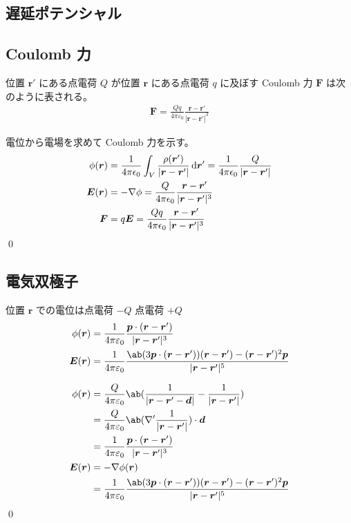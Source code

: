 \documentclass[uplatex,dvipdfmx,a4paper,11pt]{jlreq}
\makeatletter
\newcommand{\EE}{\bm{E}}
\newcommand{\rr}{\bm{r}}
\newcommand{\pp}{\bm{p}}
\newcommand{\vnabla}{\mathbf{\nabla}}
\theoremstyle{definition}
\renewenvironment{proof}[1][\proofname]{\par
  \normalfont
  \topsep6\p@\@plus6\p@ \trivlist
  \item[\hskip\labelsep{\bfseries #1}\@addpunct{\bfseries}]\ignorespaces\quad\par
}{%
  \qed\endtrivlist\@endpefalse
}
\renewcommand\proofname{証明}
\makeatother
\begin{document}
\subsection{遅延ポテンシャル}

\subsection{Coulomb 力}
\begin{theorem}
  位置 $\rr'$ にある点電荷 $Q$ が位置 $\rr$ にある点電荷 $q$ に及ぼす Coulomb 力 $\bm{F}$ は次のように表される。
  \begin{align}
    \bm{F} = \frac{Qq}{4\pi\varepsilon_0}\frac{\rr - \rr'}{|\rr - \rr'|^3}
  \end{align}
\end{theorem}
\begin{proof}
  電位から電場を求めて Coulomb 力を示す。
  \begin{align}
    \phi(\rr) & = \frac{1}{4\pi\epsilon_0}\int_V\frac{\rho(\rr')}{|\rr - \rr'|}\dl{\rr'} = \frac{1}{4\pi\epsilon_0}\frac{Q}{|\rr - \rr'|} \\
    \EE(\rr)  & = -\vnabla\phi = \frac{Q}{4\pi\epsilon_0}\frac{\rr - \rr'}{|\rr - \rr'|^3}                                                \\
    \bm{F}    & = q\EE = \frac{Qq}{4\pi\epsilon_0}\frac{\rr - \rr'}{|\rr - \rr'|^3}
  \end{align}
\end{proof}

\subsection{電気双極子}
\begin{proposition}[電気双極子]
  位置 $\rr$ での電位は点電荷 $-Q$ 点電荷 $+Q$
  \begin{align}
    \phi(\rr) & = \frac{1}{4\pi\varepsilon_0}\frac{\pp\cdot(\rr - \rr')}{|\rr - \rr'|^3}                                       \\
    \EE(\rr)  & = \frac{1}{4\pi\varepsilon_0}\frac{\ab(3\pp\cdot(\rr - \rr'))(\rr - \rr') - (\rr - \rr')^2\pp}{|\rr - \rr'|^5}
  \end{align}
\end{proposition}
\begin{proof}
  \begin{align}
    \phi(\rr) & = \frac{Q}{4\pi\varepsilon_0}\ab(\frac{1}{|\rr - \rr' - \bm{d}|} - \frac{1}{|\rr - \rr'|})                     \\
              & = \frac{Q}{4\pi\varepsilon_0}\ab(\vnabla'\frac{1}{|\rr - \rr'|})\cdot\bm{d}                                    \\
              & = \frac{1}{4\pi\varepsilon_0}\frac{\pp\cdot(\rr - \rr')}{|\rr - \rr'|^3}                                       \\
    \EE(\rr)  & = -\vnabla\phi(\rr)                                                                                            \\
              & = \frac{1}{4\pi\varepsilon_0}\frac{\ab(3\pp\cdot(\rr - \rr'))(\rr - \rr') - (\rr - \rr')^2\pp}{|\rr - \rr'|^5}
  \end{align}
\end{proof}
\end{document}
